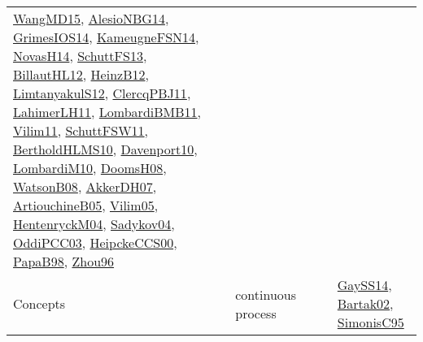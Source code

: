 {\begin{longtable}{llp{6cm}p{6cm}p{6cm}}
\href{articles/WangMD15.pdf}{WangMD15}\cite{WangMD15}, \href{papers/AlesioNBG14.pdf}{AlesioNBG14}\cite{AlesioNBG14}, \href{articles/GrimesIOS14.pdf}{GrimesIOS14}\cite{GrimesIOS14}, \href{articles/KameugneFSN14.pdf}{KameugneFSN14}\cite{KameugneFSN14}, \href{articles/NovasH14.pdf}{NovasH14}\cite{NovasH14}, \href{papers/SchuttFS13.pdf}{SchuttFS13}\cite{SchuttFS13}, \href{papers/BillautHL12.pdf}{BillautHL12}\cite{BillautHL12}, \href{papers/HeinzB12.pdf}{HeinzB12}\cite{HeinzB12}, \href{articles/LimtanyakulS12.pdf}{LimtanyakulS12}\cite{LimtanyakulS12}, \href{papers/ClercqPBJ11.pdf}{ClercqPBJ11}\cite{ClercqPBJ11}, \href{papers/LahimerLH11.pdf}{LahimerLH11}\cite{LahimerLH11}, \href{papers/LombardiBMB11.pdf}{LombardiBMB11}\cite{LombardiBMB11}, \href{papers/Vilim11.pdf}{Vilim11}\cite{Vilim11}, \href{articles/SchuttFSW11.pdf}{SchuttFSW11}\cite{SchuttFSW11}, \href{papers/BertholdHLMS10.pdf}{BertholdHLMS10}\cite{BertholdHLMS10}, \href{papers/Davenport10.pdf}{Davenport10}\cite{Davenport10}, \href{papers/LombardiM10.pdf}{LombardiM10}\cite{LombardiM10}, \href{papers/DoomsH08.pdf}{DoomsH08}\cite{DoomsH08}, \href{papers/WatsonB08.pdf}{WatsonB08}\cite{WatsonB08}, \href{papers/AkkerDH07.pdf}{AkkerDH07}\cite{AkkerDH07}, \href{papers/ArtiouchineB05.pdf}{ArtiouchineB05}\cite{ArtiouchineB05}, \href{papers/Vilim05.pdf}{Vilim05}\cite{Vilim05}, \href{papers/HentenryckM04.pdf}{HentenryckM04}\cite{HentenryckM04}, \href{papers/Sadykov04.pdf}{Sadykov04}\cite{Sadykov04}, \href{papers/OddiPCC03.pdf}{OddiPCC03}\cite{OddiPCC03}, \href{articles/HeipckeCCS00.pdf}{HeipckeCCS00}\cite{HeipckeCCS00}, \href{articles/PapaB98.pdf}{PapaB98}\cite{PapaB98}, \href{papers/Zhou96.pdf}{Zhou96}\cite{Zhou96}\\
Concepts & continuous process &  &  & \href{papers/GaySS14.pdf}{GaySS14}\cite{GaySS14}, \href{papers/Bartak02.pdf}{Bartak02}\cite{Bartak02}, \href{papers/SimonisC95.pdf}{SimonisC95}\cite{SimonisC95}\\

\end{longtable}}
